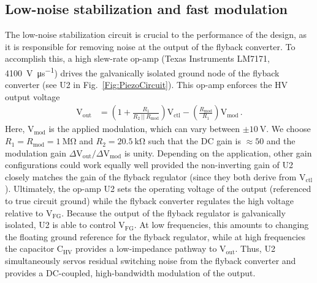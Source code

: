 \documentclass[aip,rsi,reprint]{revtex4-1} %
\begin{document}
\subsection{Low-noise stabilization and fast modulation}
\label{Sec:LowNoiseStabilization}

The low-noise stabilization circuit is crucial to the performance of the design, as it is responsible for removing noise at the output of the flyback converter.
To accomplish this, a high slew-rate op-amp (Texas Instruments LM7171, \SI[per-mode=symbol]{4100}{\volt\per\micro\second}) drives the galvanically isolated ground node of the flyback converter (see U2 in Fig.~\ref{Fig:PiezoCircuit}).
This op-amp enforces the HV output voltage
\begin{align}
\text{V}_\text{out} &= \left(1 + \frac{R_1}{R_2~||~R_\text{mod}}\right) \text{V}_\text{ctl} -
\left(\frac{R_\text{mod}}{R_1}\right) \text{V}_\text{mod}\,.
\label{Eq:FullTransferFunc}
\end{align}
Here, $\text{V}_\text{mod}$ is the applied modulation, which can vary between $\pm\SI{10}{\volt}$.
We choose $R_1 = R_\text{mod} = \SI{1}{\mega\ohm}$ and $R_2 = \SI{20.5}{\kilo\ohm}$ such that the DC gain is $\approx 50$ and the modulation gain $\Delta\text{V}_\text{out}/\Delta\text{V}_\text{mod}$ is unity.
Depending on the application, other gain configurations could work equally well provided the non-inverting gain of U2 closely matches the gain of the flyback regulator (since they both derive from $\text{V}_\text{ctl}$).
Ultimately, the op-amp U2 sets the operating voltage of the output (referenced to true circuit ground) while the flyback converter regulates the high voltage relative to $\text{V}_\text{FG}$.
Because the output of the flyback regulator is galvanically isolated, U2 is able to control $\text{V}_\text{FG}$. 
At low frequencies, this amounts to changing the floating ground reference for the flyback regulator, while at high frequencies the capacitor $\text{C}_\text{HV}$ provides a low-impedance pathway to $\text{V}_\text{out}$.
Thus, U2 simultaneously servos residual switching noise from the flyback converter and provides a DC-coupled, high-bandwidth modulation of the output.
\end{document}

